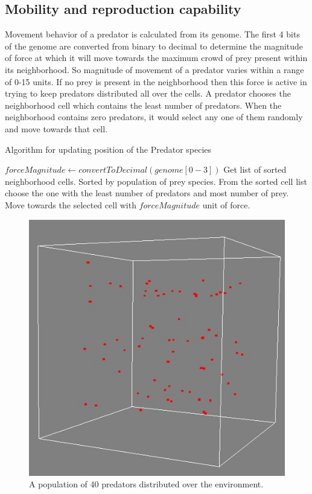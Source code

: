 \subsection{Mobility and reproduction capability}
Movement behavior of a predator is calculated from its genome. The first 4 bits of the genome are converted from binary to decimal to determine the magnitude of force at which it will move towards the maximum crowd of prey present within its neighborhood. So magnitude of movement of a predator varies within a range of 0-15 units. If no prey is present in the neighborhood then this force is active in trying to keep predators distributed all over the cells. A predator chooses the neighborhood cell which contains the least number of predators. When the neighborhood contains zero predators, it would select any one of them randomly and move towards that cell.

\begin{algorithm}[h]
	\caption{Algorithm for updating position of the Predator species}
	\label{algo:algorithm-movement-predator}
	\begin{algorithmic}
			\STATE $forceMagnitude \gets convertToDecimal(genome[0-3])$
			\STATE Get list of sorted neighborhood cells. Sorted by population of prey species.
			\STATE From the sorted cell list choose the one with the least number of predators and most number of prey.
			\STATE Move towards the selected cell with $forceMagnitude$ unit of force.
		\ENDFOR
	\end{algorithmic}
\end{algorithm}

\begin{figure}[H]
	\centering
	\includegraphics[scale=0.60]{images/predators-40}
	\caption[A population of predators]{A population of 40 predators distributed over the environment.}
	\label{fig:predators-40}
\end{figure}

